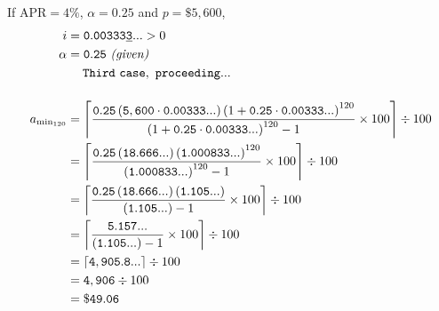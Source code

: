 \documentclass[12pt,letterpaper,oneside]{article}
\theoremstyle{remark} %
\begin{document}
	\renewcommand{\base}{\left(1+\mathtt{0.25}\cdot\mathtt{0.00333...}\right)}
	If $\mbox{APR}=4\%$, $\alpha=0.25$ and $p=\$5,600$,
	\begin{align*}
	i&=\mathtt{0.00333\underline{3}...}>0\\
	\alpha&=\mathtt{0.25}\ \textit{(given)}\\
	&\quad\;\mathtt{Third\ case,\ proceeding...}\\[12pt]
	a_{\rm{min_{120}}}&=\left\lceil{\frac{\mathtt{0.25}\left(\mathtt{5,600}\cdot\mathtt{0.00333...}\right)\base^{120}}{\base^{120}-1}\times 100}\right\rceil\div 100\\
	&=\left\lceil{\frac{\mathtt{0.25}\left(\mathtt{18.666...}\right)\left(\mathtt{1.000833...}\right)^{120}}{\left(\mathtt{1.000833...}\right)^{120}-1}\times 100}\right\rceil\div 100\\
	&=\left\lceil{\frac{\mathtt{0.25}\left(\mathtt{18.666...}\right)\left(\mathtt{1.105...}\right)}{\left(\mathtt{1.105...}\right)-1}\times 100}\right\rceil\div 100\\
	&=\left\lceil{\frac{\mathtt{5.157...}}{\left(\mathtt{1.105...}\right)-1}\times 100}\right\rceil\div 100\\
	&=\left\lceil{\mathtt{4,905.8...}}\right\rceil\div 100\\
	&=\mathtt{4,906}\div 100\\
	&=\mathtt{\$49.06}
	\end{align*}

	\newpage
\end{document}
